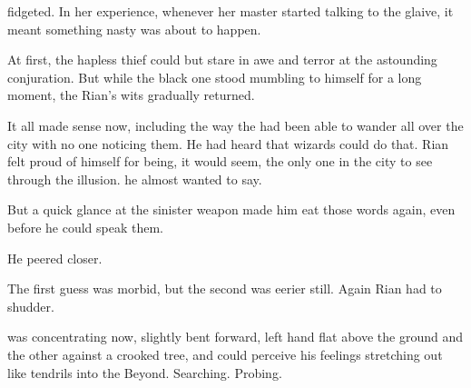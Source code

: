 \begin{garbage}
\Criseis{} fidgeted. 
In her experience, whenever her master started talking to the glaive, it meant something nasty was about to happen. 







\begin{comment}
\subsubsection{Rian}
\end{comment}
\new
At first, the hapless thief could but stare in awe and terror at the astounding conjuration. But while the black one stood mumbling to himself for a long moment, the Rian's wits gradually returned. 


It all made sense now, including the way the \scathae{} had been able to wander all over the city with no one noticing them. He had heard that wizards could do that. 
Rian felt proud of himself for being, it would seem, the only one in the city to see through the illusion. 
 he almost wanted to say. 

But a quick glance at the sinister weapon made him eat those words again, even before he could speak them. 

He peered closer. 

The first guess was morbid, but the second was eerier still. Again Rian had to shudder. 







\begin{comment}
\subsubsection{\Criseis}
\end{comment}
\new
\Ishnaruchaefir{} was concentrating now, slightly bent forward, left hand flat above the ground and the other against a crooked tree, and \Criseis{} could perceive his feelings stretching out like tendrils into the Beyond. Searching. Probing. 


\end{garbage}
